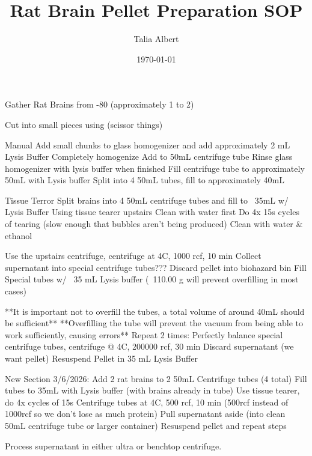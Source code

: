 \documentclass[12pt, letterpaper]{article}
\title{Rat Brain Pellet Preparation SOP}
\author{
    Talia Albert
}
\date{\today}
\begin{document}
\maketitle
\tableofcontents

Gather Rat Brains from -80 (approximately 1 to 2)

Cut into small pieces using (scissor things)

Manual
    Add small chunks to glass homogenizer and add approximately 2 mL Lysis Buffer
    Completely homogenize
    Add to 50mL centrifuge tube
    Rinse glass homogenizer with lysis buffer when finished
    Fill centrifuge tube to approximately 50mL with Lysis buffer
    Split into 4 50mL tubes, fill to approximately 40mL
    

Tissue Terror
    Split brains into 4 50mL centrifuge tubes and fill to ~35mL w/ Lysis Buffer
    Using tissue tearer upstairs
        Clean with water first
        Do 4x 15s cycles of tearing (slow enough that bubbles aren't being produced)
        Clean with water & ethanol


Use the upstairs centrifuge, centrifuge at 4C, 1000 rcf, 10 min
    Collect supernatant into special centrifuge tubes??? 
    Discard pellet into biohazard bin
    Fill Special tubes w/ ~35 mL Lysis buffer (~110.00 g will prevent overfilling in most cases)

    **It is important not to overfill the tubes, a total volume of around 40mL should be sufficient**
    **Overfilling the tube will prevent the vacuum from being able to work sufficiently, causing errors**
Repeat 2 times:
    Perfectly balance special centrifuge tubes, centrifuge @ 4C, 200000 rcf, 30 min
        Discard supernatant (we want pellet)
        Resuspend Pellet in 35 mL Lysis Buffer





New Section 3/6/2026:
Add 2 rat brains to 2 50mL Centrifuge tubes (4 total)
Fill tubes to 35mL with Lysis buffer (with brains already in tube)
Use tissue tearer, do 4x cycles of 15s
Centrifuge tubes at 4C, 500 rcf, 10 min (500rcf instead of 1000rcf so we don't lose as much protein)
Pull supernatant aside (into clean 50mL centrifuge tube or larger container)
Resuspend pellet and repeat steps

Process supernatant in either ultra or benchtop centrifuge.
\end{document}
